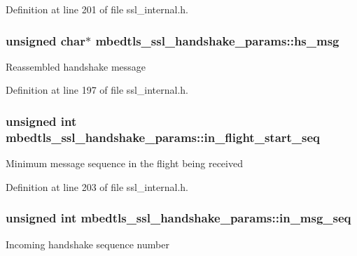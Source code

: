 Definition at line 201 of file ssl\-\_\-internal.\-h.

\hypertarget{structmbedtls__ssl__handshake__params_a7951f655fd1dda5eb8f54c4683c4da1e}{
\subsubsection[{hs\-\_\-msg}]{\setlength{\rightskip}{0pt plus 5cm}unsigned char$\ast$ mbedtls\-\_\-ssl\-\_\-handshake\-\_\-params\-::hs\-\_\-msg}}\label{structmbedtls__ssl__handshake__params_a7951f655fd1dda5eb8f54c4683c4da1e}
Reassembled handshake message 

Definition at line 197 of file ssl\-\_\-internal.\-h.

\hypertarget{structmbedtls__ssl__handshake__params_a1757d84efd08fac62efed7e9e50eaa3e}{
\subsubsection[{in\-\_\-flight\-\_\-start\-\_\-seq}]{\setlength{\rightskip}{0pt plus 5cm}unsigned int mbedtls\-\_\-ssl\-\_\-handshake\-\_\-params\-::in\-\_\-flight\-\_\-start\-\_\-seq}}\label{structmbedtls__ssl__handshake__params_a1757d84efd08fac62efed7e9e50eaa3e}
Minimum message sequence in the flight being received 

Definition at line 203 of file ssl\-\_\-internal.\-h.

\hypertarget{structmbedtls__ssl__handshake__params_a71e7df587788d6ae5e30a4957b69649b}{
\subsubsection[{in\-\_\-msg\-\_\-seq}]{\setlength{\rightskip}{0pt plus 5cm}unsigned int mbedtls\-\_\-ssl\-\_\-handshake\-\_\-params\-::in\-\_\-msg\-\_\-seq}}\label{structmbedtls__ssl__handshake__params_a71e7df587788d6ae5e30a4957b69649b}
Incoming handshake sequence number 

